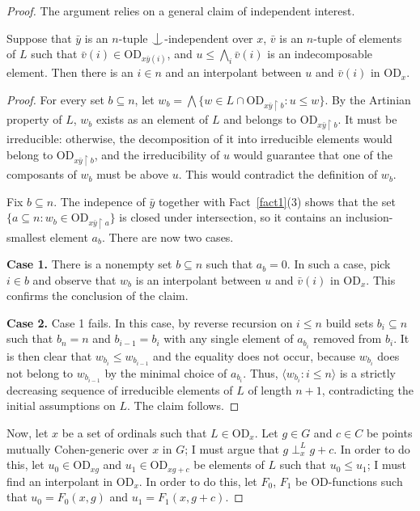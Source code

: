 \documentclass[10pt,a4paper]{amsart}
\newcommand{\forkindep}[1][]{%
  \mathrel{
    \mathop{
      \vcenter{
        \hbox{\oalign{\noalign{\kern-.3ex}\hfil$\vert$\hfil\cr
              \noalign{\kern-.7ex}
              $\smile$\cr\noalign{\kern-.3ex}}}
      }
    }\displaylimits_{#1}
  }
}
\newcommand{\vd}{\mathrm{OD}}
\begin{document}
\begin{proof}
The argument relies on a general claim of independent interest.

\begin{claim}
\label{duplicationclaim}
Suppose that $\bar y$ is an $n$-tuple $\forkindep$-independent over $x$, $\bar v$ is an $n$-tuple of elements of $L$ such that $\bar v(i)\in \vd_{x\bar y(i)}$, and $u\leq\bigwedge_i\bar v(i)$ is an indecomposable element. Then there is an $i\in n$ and an interpolant between $u$ and $\bar v(i)$ in $\vd_x$.
\end{claim}

\begin{proof}
For every set $b\subseteq n$, let $w_b=\bigwedge\{w\in L\cap \vd_{x\bar y\restriction b}\colon u\leq w\}$. By the Artinian property of $L$, $w_b$ exists as an element of $L$ and belongs to $\vd_{x\bar y\restriction b}$. It must be irreducible: otherwise, the decomposition of it into irreducible elements would belong to $\vd_{x\bar y\restriction b}$, and the irreducibility of $u$ would guarantee that one of the composants of $w_b$ must be above $u$. This would contradict the definition of $w_b$.

Fix $b\subseteq n$. The indepence of $\bar y$ together with Fact~\ref{fact1}(3) shows that the set $\{a\subseteq n\colon w_b\in\vd_{x\bar y\restriction a}\}$ is closed under intersection, so it contains an inclusion-smallest element $a_b$. There are now two cases.

\noindent\textbf{Case 1.} There is a nonempty set $b\subseteq n$ such that $a_b=0$. In such a case, pick $i\in b$ and observe that $w_b$ is an interpolant between $u$ and $\bar v(i)$ in $\vd_x$. This confirms the conclusion of the claim.

\noindent\textbf{Case 2.} Case 1 fails. In this case, by reverse recursion on $i\leq n$ build sets $b_i\subseteq n$ such that $b_n=n$ and $b_{i-1}=b_i$ with any single element of $a_{b_i}$ removed from $b_i$. It is then clear that $w_{b_i}\leq w_{b_{i-1}}$ and the equality does not occur, because $w_{b_i}$ does not belong to $w_{b_{i-1}}$ by the minimal choice of $a_{b_i}$. Thus, $\langle w_{b_i}\colon i\leq n\rangle$ is a strictly decreasing sequence of irreducible elements of $L$ of length $n+1$, contradicting the initial assumptions on $L$. The claim follows.
\end{proof}

Now, let $x$ be a set of ordinals such that $L\in\vd_x$. Let $g\in G$ and $c\in C$ be points mutually Cohen-generic over $x$ in $G$; I must argue that $g\perp^L_x g+c$. In order to do this, let $u_0\in \vd_{xg}$ and $u_1\in\vd_{xg+c}$ be elements of $L$ such that $u_0\leq u_1$; I must find an interpolant in $\vd_x$. In order to do this, let $F_0$, $F_1$ be $\vd$-functions such that $u_0=F_0(x, g)$ and $u_1=F_1(x, g+c)$.


\end{proof}
\end{document}
